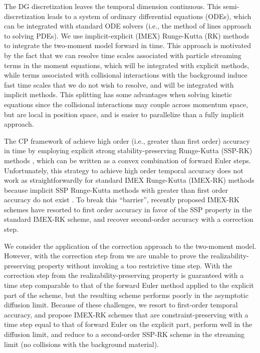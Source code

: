 The DG discretization leaves the temporal dimension continuous.  
This semi-discretization leads to a system of ordinary differential equations (ODEs), which can be integrated with standard ODE solvers (i.e., the method of lines approach to solving PDEs).  
We use implicit-explicit (IMEX) Runge-Kutta (RK) methods \cite{ascher_etal_1997,pareschiRusso_2005} to integrate the two-moment model forward in time.  
This approach is motivated by the fact that we can resolve time scales associated with particle streaming terms in the moment equations, which will be integrated with explicit methods, while terms associated with collisional interactions with the background induce fast time scales that we do not wish to resolve, and will be integrated with implicit methods.  
This splitting has some advantages when solving kinetic equations since the collisional interactions may couple across momentum space, but are local in position space, and is easier to parallelize than a fully implicit approach.  

The CP framework of \cite{zhangShu_2010a} achieve high order (i.e., greater than first order) accuracy in time by employing explicit strong stability-preserving Runge-Kutta (SSP-RK) methods \cite{shuOsher_1988,gottlieb_etal_2001}, which can be written as a convex combination of forward Euler steps.  
Unfortunately, this strategy to achieve high order temporal accuracy does not work as straightforwardly for standard IMEX Runge-Kutta (IMEX-RK) methods because implicit SSP Runge-Kutta methods with greater than first order accuracy do not exist \cite{gottlieb_etal_2001}.  
To break this ``barrier'', recently proposed IMEX-RK schemes \cite{chertock_etal_2015,hu_etal_2018} have resorted to first order accuracy in favor of the SSP property in the standard IMEX-RK scheme, and recover second-order accuracy with a correction step.  

We consider the application of the correction approach to the two-moment model.  
However, with the correction step from \cite{chertock_etal_2015} we are unable to prove the realizability-preserving property without invoking a too restrictive time step.  
With the correction step from \cite{hu_etal_2018} the realizability-preserving property is guaranteed with a time step comparable to that of the forward Euler method applied to the explicit part of the scheme, but the resulting scheme performs poorly in the asymptotic diffusion limit.  
Because of these challenges, we resort to first-order temporal accuracy, and propose IMEX-RK schemes that are constraint-preserving with a time step equal to that of forward Euler on the explicit part, perform well in the diffusion limit, and reduce to a second-order SSP-RK scheme in the streaming limit (no collisions with the background material).  

